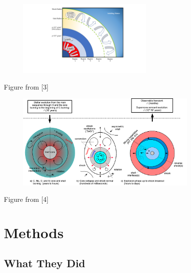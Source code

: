 \documentclass[aspectratio=169]{beamer}
\begin{document}
\begin{frame}

  \begin{figure}
    \includegraphics[width=0.6\textwidth]{Figures/regionsCartoon.pdf}
  \end{figure}
  Figure from [3]

\end{frame}

\begin{frame}

  \begin{figure}
    \includegraphics[width=0.8\textwidth]{Figures/asymmetry.pdf}
  \end{figure}
  Figure from [4]

\end{frame}

\section{Methods}

\subsection{What They Did}
\end{document}
